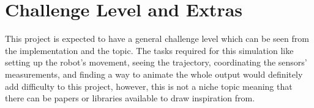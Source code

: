 \documentclass{article}
\begin{document}
\section{Challenge Level and Extras}
This project is expected to have a general challenge level which can be seen from the implementation and the topic. The tasks required for this simulation like setting up the robot's movement, seeing the trajectory, coordinating the sensors' measurements, and finding a way to animate the whole output would definitely add difficulty to this project, however, this is not a niche topic meaning that there can be papers or libraries available to draw inspiration from.

\newpage{}
\end{document}
